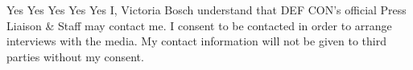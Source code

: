 \documentclass{article}
\begin{document}
Yes
Yes
Yes
Yes
Yes
I, Victoria Bosch understand that DEF CON's official Press Liaison & Staff may contact me. I consent to be contacted in order to arrange interviews with the media. My contact information will not be given to third parties without my consent.
%
\end{document}
